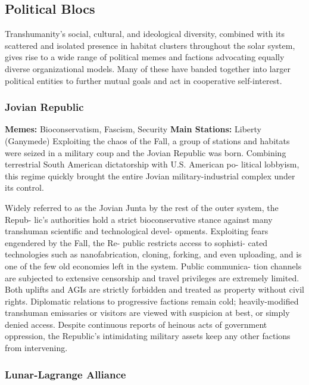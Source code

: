 \subsection{Political Blocs}

Transhumanity's social, cultural, and ideological 
diversity, combined with its scattered and isolated 
presence in habitat clusters throughout the solar 
system, gives rise to a wide range of political memes 
and factions advocating equally diverse organizational 
models. Many of these have banded together into 
larger political entities to further mutual goals and act 
in cooperative self-interest.

\subsubsection{Jovian Republic}

\textbf{Memes:} Bioconservatism, Fascism, Security
\textbf{Main Stations:} Liberty (Ganymede)
Exploiting the chaos of the Fall, a group of stations 
and habitats were seized in a military coup and the 
Jovian Republic was born. Combining terrestrial 
South American dictatorship with U.S. American po-
litical lobbyism, this regime quickly brought the entire 
Jovian military-industrial complex under its control.

Widely referred to as the 
Jovian Junta by the rest of the 
outer system, the Repub-
lic's authorities hold a 
strict bioconservative 
stance against many 
transhuman scientific 
and technological devel-
opments. Exploiting fears 
engendered by the Fall, the Re-
public restricts access to sophisti-
cated technologies such as nanofabrication, cloning, 
forking, and even uploading, and is one of the few 
old economies left in the system. Public communica-
tion channels are subjected to extensive censorship 
and travel privileges are extremely limited. Both 
uplifts and AGIs are strictly forbidden and treated 
as property without civil rights. Diplomatic relations 
to progressive factions remain cold; heavily-modified 
transhuman emissaries or visitors are viewed with 
suspicion at best, or simply denied access. Despite 
continuous reports of heinous acts of government 
oppression, the Republic's intimidating military assets 
keep any other factions from intervening.

\subsubsection{Lunar-Lagrange Alliance}

